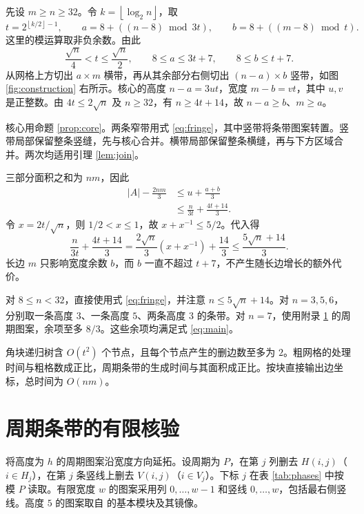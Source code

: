 \documentclass[UTF8,11pt,a4paper,fontset=none]{ctexart}
\makeatletter
\theoremstyle{plain}
\theoremstyle{definition}
\renewcommand{\proofname}{证明}
\newcommand{\floor}[1]{\left\lfloor #1\right\rfloor}
\renewenvironment{proof}[1][\proofname]{\par
  \pushQED{\qed}%
  \normalfont
  \topsep6\p@\@plus6\p@\relax
  \trivlist
  \item[\hskip\labelsep
        \bfseries#1\@addpunct{.}]%
  \ignorespaces
}{%
  \popQED\endtrivlist\@endpefalse
}
\makeatother
\begin{document}
\begin{proof}[定理 \ref{thm:main} 的证明]
先设 \(m\ge n\ge32\)。令 \(k=\floor{\log_2 n}\)，取
\begin{equation}\label{eq:choose}
  t=2^{\floor{k/2}-1},\qquad
  a=8+((n-8)\bmod 3t),\qquad
  b=8+((m-8)\bmod t).
\end{equation}
这里的模运算取非负余数。由此
\[
  \frac{\sqrt n}{4}<t\le \frac{\sqrt n}{2},\qquad
  8\le a\le3t+7,\qquad 8\le b\le t+7.
\]
从网格上方切出 \(a\times m\) 横带，再从其余部分右侧切出 \((n-a)\times b\) 竖带，如图 \ref{fig:construction} 右所示。核心的高度 \(n-a=3ut\)，宽度 \(m-b=vt\)，其中 \(u,v\) 是正整数。由 \(4t\le2\sqrt n\) 及 \(n\ge32\)，有 \(n\ge4t+14\)，故 \(n-a\ge b\)、\(m\ge a\)。

核心用命题 \ref{prop:core}。两条窄带用式 \eqref{eq:fringe}，其中竖带将条带图案转置。竖带局部保留整条竖缝，先与核心合并。横带局部保留整条横缝，再与下方区域合并。两次均适用引理 \ref{lem:join}。

三部分面积之和为 \(nm\)，因此
\begin{align*}
 |A|-\frac{2nm}{3}
 &\le u+\frac{a+b}{3}\\
 &\le \frac{n}{3t}+\frac{4t+14}{3}.
\end{align*}
令 \(x=2t/\sqrt n\)，则 \(1/2<x\le1\)，故 \(x+x^{-1}\le5/2\)。代入得
\[
 \frac{n}{3t}+\frac{4t+14}{3}
 =\frac{2\sqrt n}{3}(x+x^{-1})+\frac{14}{3}
 \le\frac{5\sqrt n+14}{3}.
\]
长边 \(m\) 只影响宽度余数 \(b\)，而 \(b\) 一直不超过 \(t+7\)，不产生随长边增长的额外代价。

对 \(8\le n<32\)，直接使用式 \eqref{eq:fringe}，并注意 \(n\le5\sqrt n+14\)。对 \(n=3,5,6\)，分别取一条高度 \(3\)、一条高度 \(5\)、两条高度 \(3\) 的条带。对 \(n=7\)，使用附录 \ref{sec:period} 的周期图案，余项至多 \(8/3\)。这些余项均满足式 \eqref{eq:main}。

角块递归树含 \(O(t^2)\) 个节点，且每个节点产生的删边数至多为 \(2\)。粗网格的处理时间与粗格数成正比，周期条带的生成时间与其面积成正比。按块直接输出边坐标，总时间为 \(O(nm)\)。
\end{proof}

\appendix
\section{周期条带的有限核验}\label{sec:period}

将高度为 \(h\) 的周期图案沿宽度方向延拓。设周期为 \(P\)，在第 \(j\) 列删去 \(H(i,j)\)（\(i\in H_j\)），在第 \(j\) 条竖线上删去 \(V(i,j)\)（\(i\in V_j\)）。下标 \(j\) 在表 \ref{tab:phases} 中按模 \(P\) 读取。有限宽度 \(w\) 的图案采用列 \(0,\ldots,w-1\) 和竖线 \(0,\ldots,w\)，包括最右侧竖线。高度 \(5\) 的图案取自 \cite[图 7]{niujournal} 的基本模块及其镜像。
\end{document}
